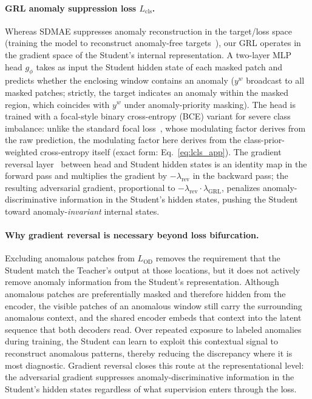 \paragraph{GRL anomaly suppression loss $L_{\mathrm{cls}}$.}
Whereas SDMAE suppresses anomaly reconstruction in the target/loss space (training the model to
reconstruct anomaly-free targets~\cite{ristea2024sdmae}), our GRL operates in the gradient space
of the Student's internal representation.
A two-layer MLP head $g_\phi$ takes as input the Student hidden state of each masked patch and
predicts whether the enclosing window contains an anomaly ($y^w$ broadcast to all masked patches;
strictly, the target indicates an anomaly within the masked region, which coincides with $y^w$
under anomaly-priority masking).
The head is trained with a focal-style binary cross-entropy (BCE) variant for severe class
imbalance: unlike the standard focal loss~\cite{lin2017focal}, whose modulating factor derives
from the raw prediction, the modulating factor here derives from the class-prior-weighted
cross-entropy itself (exact form: Eq.~\ref{eq:lcls_app}).
The gradient reversal layer~\cite{ganin2016dann} between head and Student hidden states is an
identity map in the forward pass and multiplies the gradient by $-\lambda_{\mathrm{rev}}$ in the
backward pass; the resulting adversarial gradient, proportional to
$-\lambda_{\mathrm{rev}} \cdot \lambda_{\mathrm{GRL}}$, penalizes anomaly-discriminative
information in the Student's hidden states, pushing the Student toward anomaly-\emph{invariant}
internal states.

\paragraph{Why gradient reversal is necessary beyond loss bifurcation.}
Excluding anomalous patches from $L_{\mathrm{OD}}$ removes the requirement that the Student
match the Teacher's output at those locations, but it does not actively remove anomaly information
from the Student's representation.
Although anomalous patches are preferentially masked and therefore hidden from the encoder, the
visible patches of an anomalous window still carry the surrounding anomalous context, and the
shared encoder embeds that context into the latent sequence that both decoders read.
Over repeated exposure to labeled anomalies during training, the Student can learn to exploit
this contextual signal to reconstruct anomalous patterns, thereby reducing the discrepancy where
it is most diagnostic.
Gradient reversal closes this route at the representational level: the adversarial gradient
suppresses anomaly-discriminative information in the Student's hidden states regardless of what
supervision enters through the loss.

